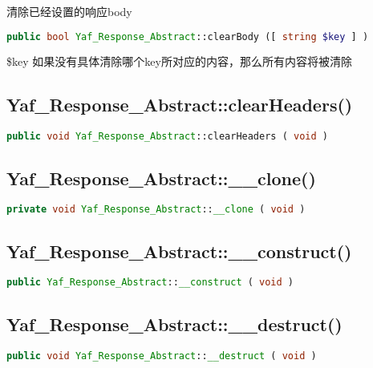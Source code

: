 清除已经设置的响应body

\begin{lstlisting}[language=PHP]
public bool Yaf_Response_Abstract::clearBody ([ string $key ] )
\end{lstlisting}

\begin{compactitem}
\item \$key 如果没有具体清除哪个key所对应的内容，那么所有内容将被清除
\end{compactitem}



\subsection{Yaf\_Response\_Abstract::clearHeaders()}



\begin{lstlisting}[language=PHP]
public void Yaf_Response_Abstract::clearHeaders ( void )
\end{lstlisting}



\subsection{Yaf\_Response\_Abstract::\_\_clone()}


\begin{lstlisting}[language=PHP]
private void Yaf_Response_Abstract::__clone ( void )
\end{lstlisting}


\subsection{Yaf\_Response\_Abstract::\_\_construct()}


\begin{lstlisting}[language=PHP]
public Yaf_Response_Abstract::__construct ( void )
\end{lstlisting}

\subsection{Yaf\_Response\_Abstract::\_\_destruct()}


\begin{lstlisting}[language=PHP]
public void Yaf_Response_Abstract::__destruct ( void )
\end{lstlisting}

